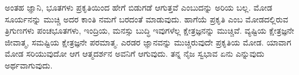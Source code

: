 ಅಂತಹ ಜ್ಞಾನಿ, ಭೂತಗಳು ಪ್ರಕೃತಿಯಿಂದ ಹೇಗೆ ಬಿಡುಗಡೆ ಆಗುತ್ತವೆ ಎಂಬುದನ್ನು ಅರಿಯ ಬಲ್ಲ. ಮೋಡ ಸೂರ್ಯನನ್ನು ಮುಚ್ಚಿ ಅದರ ಕಾಂತಿ ನಮಗೆ ಬರದಂತೆ ಮಾಡುವುದು. ಹಾಗೆಯೆ ಪ್ರಕೃತಿ ಎಂಬ ಮೋಡದಲ್ಲಿರುವ ತ್ರಿಗುಣಗಳು ಪಂಚಭೂತಗಳು, ಇಂದ್ರಿಯ, ಮನಸ್ಸು ಬುದ್ಧಿ ಇವುಗಳೆಲ್ಲ ಕ್ಷೇತ್ರಜ್ಞನನ್ನು ಮುಚ್ಚಿವೆ. ವ್ಯಷ್ಟಿಯ ಕ್ಷೇತ್ರಜ್ಞನೇ ಜೀವಾತ್ಮ, ಸಮಷ್ಟಿಯ ಕ್ಷೇತ್ರಜ್ಞನೇ ಪರಮಾತ್ಮ. ಎರಡರ ಜ್ಞಾನವನ್ನು ಮುಚ್ಚಿರುವುದೇ ಪ್ರಕೃತಿಯ ಮೋಡ. ಯಾವಾಗ ಮೋಡ ಸರಿಯುವುದೋ ಆಗ ಆತ್ಮದರ್ಶನ ಅವನಿಗೆ ಆಗುವುದು. ತನ್ನ ನೈಜ ಸ್ವಭಾವ ಏನು ಎನ್ನುವುದು ಅರ್ಥವಾಗುವುದು.

